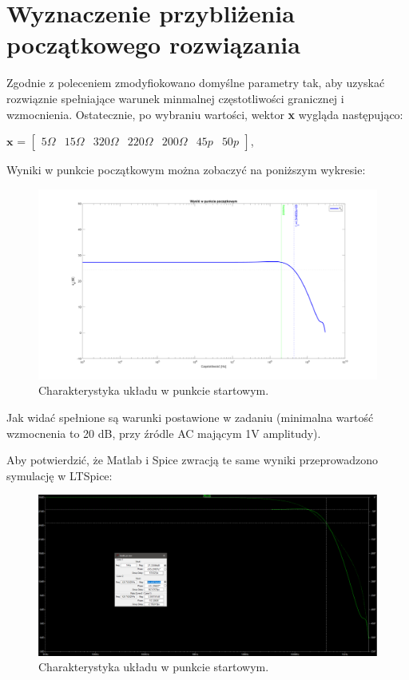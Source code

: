 \documentclass{article}
\begin{document}
\section{Wyznaczenie przybliżenia początkowego rozwiązania}
Zgodnie z poleceniem zmodyfiokowano domyślne parametry tak, aby uzyskać rozwiąznie spełniające warunek minmalnej częstotliwości granicznej i wzmocnienia.
Ostatecznie, po wybraniu wartości, wektor \textbf{x} wygląda następująco:
\begin{center}
	$\textbf{x}$ =
	$\begin{bmatrix}
			5\Omega & 15\Omega & 320\Omega & 220\Omega & 200\Omega & 45p & 50p
		\end{bmatrix}$,
\end{center}

Wyniki w punkcie początkowym można zobaczyć na poniższym wykresie:

\begin{figure}[h]
	\includegraphics[width=12cm]{graphics/starting_point.png}
	\centering
	\caption{Charakterystyka układu w punkcie startowym.}
\end{figure}

Jak widać spełnione są warunki postawione w zadaniu (minimalna wartość wzmocnenia to 20 dB, przy źródle AC mającym 1V amplitudy).
\pagebreak

Aby potwierdzić, że Matlab i Spice zwracją te same wyniki przeprowadzono symulację w LTSpice:
\begin{figure}[h]
	\includegraphics[width=12cm]{graphics/starting_point_spice.png}
	\centering
	\caption{Charakterystyka układu w punkcie startowym.}
\end{figure}
\end{document}
